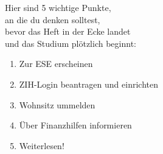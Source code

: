 
\hspace*{4em}Hier sind 5 wichtige Punkte,\\
\hspace*{8em}an die du denken solltest,\\
\hspace*{12em}bevor das Heft in der Ecke landet\\
\hspace*{16em}und das Studium plötzlich beginnt:\\[2em]

{%
\LARGE
\hspace*{2cm}
\begin{enumerate}[label={\raisebox{.1cm}{\colorbox{gray!60}{\normalsize\textcolor{white}{\arabic*}}}}, itemsep=1cm, labelsep=.75cm, labelindent=.75cm, leftmargin=*]
  \item Zur ESE erscheinen
  \item ZIH-Login beantragen und einrichten
  \item Wohnsitz ummelden
  \item Über Finanzhilfen informieren
  \item Weiterlesen!
\end{enumerate}
}
